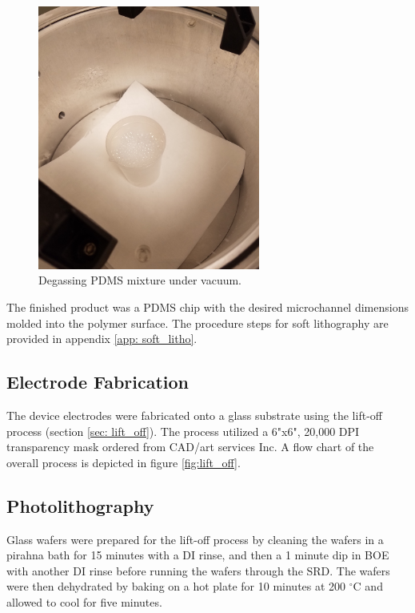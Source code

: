 \begin{figure}[h]
    \centering
    \includegraphics[width=0.65\textwidth]{images/pdms_in_vacuum.jpg}
    \caption{Degassing PDMS mixture under vacuum.}
    \label{fig:pdms_vacuum}
\end{figure}


\par The finished product was a PDMS chip with the desired microchannel dimensions molded into the polymer surface. The procedure steps for soft lithography are provided in appendix \ref{app: soft_litho}.


\subsection{Electrode Fabrication}

\par The device electrodes were fabricated onto a glass substrate using the lift-off process (section \ref{sec: lift_off}). The process utilized a 6"x6", 20,000 DPI transparency mask ordered from CAD/art services Inc. A flow chart of the overall process is depicted in figure \ref{fig:lift_off}.

\subsection*{Photolithography}

\par Glass wafers were prepared for the lift-off process by cleaning the wafers in a pirahna bath for 15 minutes with a DI rinse, and then a 1 minute dip in BOE with another DI rinse before running the wafers through the SRD. The wafers were then dehydrated by baking on a hot plate for 10 minutes at 200 $^\circ$C and allowed to cool for five minutes. 


